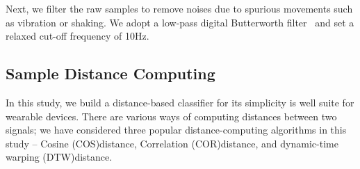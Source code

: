 Next, we filter the raw samples to remove noises due to spurious movements such as vibration or shaking.
We adopt a low-pass digital Butterworth
filter~\cite{challis1983design} and set a relaxed cut-off frequency of 10Hz.


\subsection{Sample Distance Computing}\label{subsec:distance}


In this study, we build a distance-based classifier for its simplicity is well suite for wearable devices. There are various ways of computing distances between two signals; we have considered three popular distance-computing algorithms in this study -- Cosine (COS)distance, Correlation (COR)distance, and dynamic-time warping (DTW)distance.

